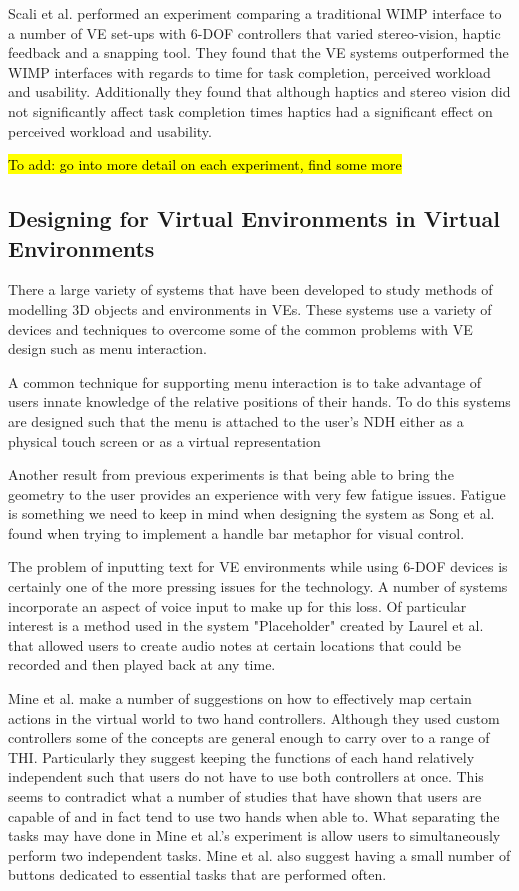 \documentclass{sig-alternate-05-2015}
\begin{document}
 Scali et al. performed an experiment comparing a traditional WIMP interface to a number of VE set-ups with 6-DOF controllers that varied stereo-vision, haptic feedback and a snapping tool\cite{Scali2003}. They found that the VE systems outperformed the WIMP interfaces with regards to time for task completion, perceived workload and usability. Additionally they found that although haptics and stereo vision did not significantly affect task completion times haptics had a significant effect on perceived workload and usability.
 
 \hl{To add: go into more detail on each experiment, find some more}
\subsection{Designing for Virtual Environments in Virtual Environments}
There a large variety of systems that have been developed to study methods of modelling 3D objects and environments in VEs. These systems use a variety of devices and techniques to overcome some of the common problems with VE design such as menu interaction.

A common technique for supporting menu interaction is to take advantage of users innate knowledge of the relative positions of their hands\cite{Bowman1998, Buxton1986}. To do this systems are designed such that the menu is attached to the user's NDH either as a physical touch screen\cite{Wang2013,Mine2014} or as a virtual representation\cite{Jerald2013}

Another result from previous experiments is that being able to bring the geometry to the user provides an experience with very few fatigue issues\cite{Jerald2013}. Fatigue is something we need to keep in mind when designing the system as Song et al. found when trying to implement a handle bar metaphor for visual control\cite{Song2012}.

The problem of inputting text for VE environments while using 6-DOF devices is certainly one of the more pressing issues for the technology. A number of systems incorporate an aspect of voice input to make up for this loss\cite{Ponto2013,Toma2012}. Of particular interest is a method used in the system "Placeholder" created by Laurel et al. that allowed users to create audio notes at certain locations that could be recorded and then played back at any time\cite{Laurel1994}.

Mine et al. make a number of suggestions on how to effectively map certain actions in the virtual world to two hand controllers\cite{Mine2014}. Although they used custom controllers some of the concepts are general enough to carry over to a range of THI. Particularly they suggest keeping the functions of each hand relatively independent such that users do not have to use both controllers at once. This seems to contradict what a number of studies that have shown that users are capable of and in fact tend to use two hands when able to\cite{Buxton1986,Hinckley1994}. What separating the tasks may have done in Mine et al.'s experiment is allow users to simultaneously perform two independent tasks.  Mine et al. also suggest having a small number of buttons dedicated to essential tasks that are performed often\cite{Mine2014}.
\end{document}

